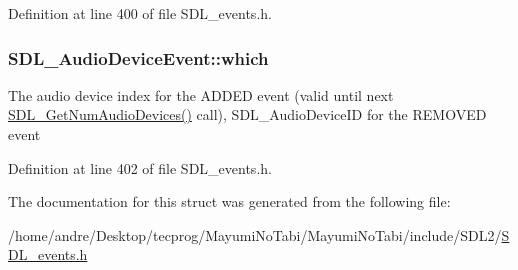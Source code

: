Definition at line 400 of file S\-D\-L\-\_\-events.\-h.

\hypertarget{struct_s_d_l___audio_device_event_ac91d70fd4e1dd596185fed061388896c}{
\subsubsection[{which}]{ S\-D\-L\-\_\-\-Audio\-Device\-Event\-::which}}\label{struct_s_d_l___audio_device_event_ac91d70fd4e1dd596185fed061388896c}
The audio device index for the A\-D\-D\-E\-D event (valid until next \hyperlink{_s_d_l__audio_8h_ae165f64b3f0fecfebe1c97731600ca59}{S\-D\-L\-\_\-\-Get\-Num\-Audio\-Devices()} call), S\-D\-L\-\_\-\-Audio\-Device\-I\-D for the R\-E\-M\-O\-V\-E\-D event 

Definition at line 402 of file S\-D\-L\-\_\-events.\-h.



The documentation for this struct was generated from the following file\-:\begin{DoxyCompactItemize}
\item 
/home/andre/\-Desktop/tecprog/\-Mayumi\-No\-Tabi/\-Mayumi\-No\-Tabi/include/\-S\-D\-L2/\hyperlink{_s_d_l__events_8h}{S\-D\-L\-\_\-events.\-h}\end{DoxyCompactItemize}
